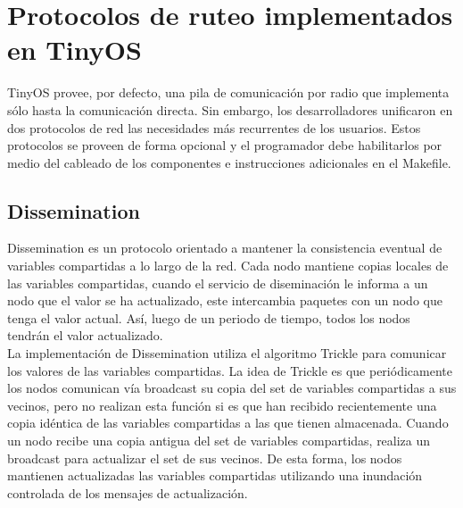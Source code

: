 

\section{Protocolos de ruteo implementados en TinyOS}

TinyOS provee, por defecto, una pila de comunicación por radio que implementa sólo hasta la comunicación directa. Sin embargo, los desarrolladores unificaron en dos protocolos de red las necesidades más recurrentes de los usuarios\cite{What2ndGenHolds}. Estos protocolos se proveen de forma opcional y el programador debe habilitarlos por medio del cableado de los componentes e instrucciones adicionales en el Makefile.

\subsection{Dissemination }
Dissemination\cite{TEP118} es un protocolo orientado a mantener la consistencia eventual de variables compartidas a lo largo de la red. Cada nodo mantiene copias locales de las variables compartidas, cuando el servicio de diseminación le informa a un nodo que el valor se ha actualizado, este intercambia paquetes con un nodo que tenga el valor actual. Así, luego de un periodo de tiempo, todos los nodos tendrán el valor actualizado.\\

La implementación de Dissemination utiliza el algoritmo Trickle \cite{TricklePaper} para comunicar los valores de las variables compartidas. La idea de Trickle es que periódicamente los nodos comunican vía broadcast su copia del set de variables compartidas a sus vecinos, pero no realizan esta función si es que han recibido recientemente una copia idéntica de las variables compartidas a las que tienen almacenada. Cuando un nodo recibe una copia antigua del set de variables compartidas, realiza un broadcast para actualizar el set de sus vecinos. De esta forma, los nodos mantienen actualizadas las variables compartidas utilizando una inundación controlada de los mensajes de actualización.

